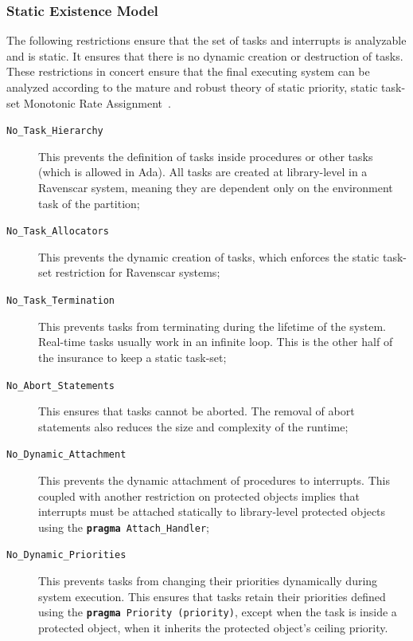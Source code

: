 \subsubsection{Static Existence Model}
The following restrictions ensure that the set of tasks and interrupts
is analyzable and is static. It ensures that there is no dynamic
creation or destruction of tasks. These restrictions in concert ensure
that the final executing system can be analyzed according to the
mature and robust theory of static priority, static task-set Monotonic
Rate Assignment~\cite{liu@jacm73}.

\begin{description}
\item[\texttt{No\_Task\_Hierarchy}] This prevents the definition of
  tasks inside procedures or other tasks (which is allowed in
  Ada). All tasks are created at library-level in a Ravenscar system,
  meaning they are dependent only on the environment task of the
  partition;

\item[\texttt{No\_Task\_Allocators}] This prevents the dynamic
creation of tasks, which enforces the static task-set restriction for
Ravenscar systems;

\item[\texttt{No\_Task\_Termination}] This prevents tasks from
terminating during the lifetime of the system. Real-time tasks usually
work in an infinite loop. This is the other half of the insurance to
keep a static task-set;

\item[\texttt{No\_Abort\_Statements}] This ensures that tasks
cannot be aborted. The removal of abort statements also reduces the
size and complexity of the runtime;

\item[\texttt{No\_Dynamic\_Attachment}] This prevents the dynamic
attachment of procedures to interrupts. This coupled with another
restriction on protected objects implies that interrupts must be
attached statically to library-level protected objects using the
\texttt{\textbf{pragma} Attach\_Handler};

\item[\texttt{No\_Dynamic\_Priorities}] This prevents tasks from
changing their priorities dynamically during system execution. This
ensures that tasks retain their priorities defined using the
\texttt{\textbf{pragma} Priority (priority)}, except when the task is
inside a protected object, when it inherits the protected object's
ceiling priority.
\end{description}

